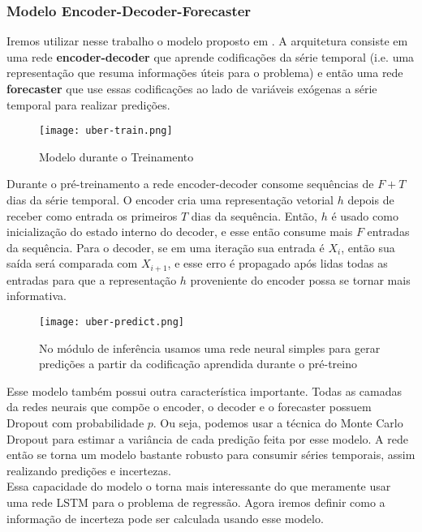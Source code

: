 \subsubsection{Modelo Encoder-Decoder-Forecaster}

Iremos utilizar nesse trabalho o modelo proposto em \citep{ubertime}. A
arquitetura consiste em uma rede \textbf{encoder-decoder} que aprende codificações da
série temporal (i.e. uma representação que resuma informações úteis para o
problema) e então uma rede \textbf{forecaster} que use essas codificações ao lado de
variáveis exógenas a série temporal para realizar predições.  



\begin{figure}[H]
\centering
\texttt{[image: uber-train.png]}
\caption{Modelo durante o Treinamento \citep{ubertime}}
\label{img:uber1}
\end{figure}


Durante o pré-treinamento a rede encoder-decoder consome sequências de $F + T$ dias
da série temporal. O encoder cria uma representação vetorial $h$ depois de
receber como entrada os primeiros $T$ dias da sequência. Então, $h$ é usado como
inicialização do estado interno do decoder, e esse então consume mais $F$
entradas da sequência. Para o decoder, se em uma iteração sua entrada é $X_i$,
então sua saída será comparada com $X_{i+1}$, e esse erro é propagado após lidas
todas as entradas para que a representação $h$ proveniente do encoder possa se
tornar mais informativa.


\begin{figure}[H]
  \centering
  \texttt{[image: uber-predict.png]}
  \caption{No módulo de inferência usamos uma rede neural simples para gerar
    predições a partir da codificação aprendida durante o pré-treino \citep{ubertime}}
  \label{img:uber2}
\end{figure}




Esse modelo também possui outra característica importante. Todas as camadas da
redes neurais que compõe o encoder, o decoder e o forecaster possuem
Dropout com probabilidade $p$. Ou seja, podemos usar a técnica do Monte
Carlo Dropout para estimar a variância de cada predição feita por esse modelo. A
rede então se torna um modelo bastante robusto para consumir séries temporais,
assim realizando predições e incertezas.\\


Essa capacidade do modelo o torna mais interessante do que meramente usar uma
rede LSTM para o problema de regressão. Agora iremos definir como a informação
de incerteza pode ser calculada usando esse modelo. \\

